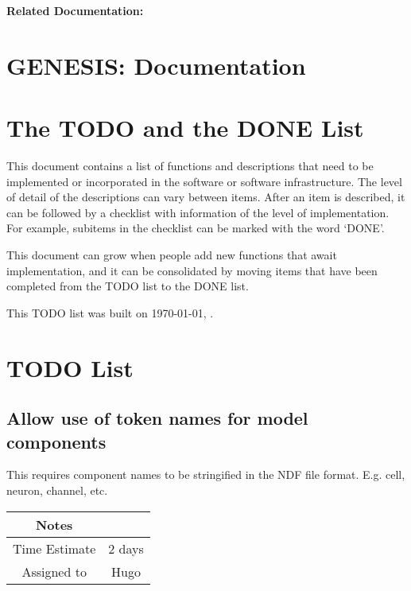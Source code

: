 \documentclass[12pt]{article}
\begin{document}
{\bf Related Documentation:}

\section*{GENESIS: Documentation}

\section{The TODO and the DONE List}

This document contains a list of functions and descriptions that need
to be implemented or incorporated in the software or software
infrastructure.  The level of detail of the descriptions can vary
between items.  After an item is described, it can be followed by a
checklist with information of the level of implementation.  For
example, subitems in the checklist can be marked with the word `DONE'.

This document can grow when people add new functions that await
implementation, and it can be consolidated by moving items that have
been completed from the TODO list to the DONE list.

This TODO list was built on \today, \thistime.


\section{TODO List}

\subsection{Allow use of token names for model components}

This requires component names to be stringified in the NDF file format. E.g. cell, neuron, channel, etc.

{
  \vspace{5mm}
  \centering
  \begin{tabular}{|c|c|}
    \hline
    Notes
    & \\
    \hline
    Time Estimate
    & 2 days \\
    \hline
    Assigned to
    & Hugo \\
    \hline
  \end{tabular}
}
\end{document}
